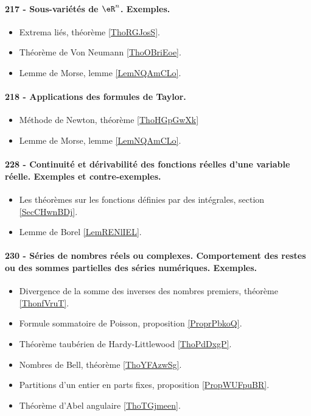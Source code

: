 \paragraph{217 - Sous-variétés de \( \eR^n\). Exemples.}
\begin{itemize}
    \item Extrema liés, théorème \ref{ThoRGJosS}.
    \item Théorème de Von Neumann \ref{ThoOBriEoe}.
    \item Lemme de Morse, lemme \ref{LemNQAmCLo}.
\end{itemize}
\paragraph{218 - Applications des formules de Taylor.}
\begin{itemize}
    \item Méthode de Newton, théorème \ref{ThoHGpGwXk}
    \item Lemme de Morse, lemme \ref{LemNQAmCLo}.
\end{itemize}
\paragraph{228 - Continuité et dérivabilité des fonctions réelles d'une variable réelle. Exemples et contre-exemples.}
\begin{itemize}
    \item Les théorèmes sur les fonctions définies par des intégrales, section \ref{SecCHwnBDj}.
    \item Lemme de Borel \ref{LemRENlIEL}.
\end{itemize}
\paragraph{230 - Séries de nombres réels ou complexes. Comportement des restes ou des sommes partielles des séries numériques. Exemples.}
\begin{itemize}
    \item Divergence de la somme des inverses des nombres premiers, théorème \ref{ThonfVruT}.
    \item Formule sommatoire de Poisson, proposition \ref{ProprPbkoQ}.
    \item Théorème taubérien de Hardy-Littlewood \ref{ThoPdDxgP}.
    \item Nombres de Bell, théorème \ref{ThoYFAzwSg}.
    \item Partitions d'un entier en parts fixes, proposition \ref{PropWUFpuBR}.
    \item Théorème d'Abel angulaire \ref{ThoTGjmeen}.
\end{itemize}
